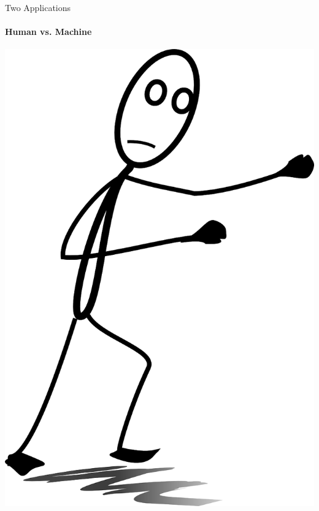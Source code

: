{\nologo
\begin{frame}{Two Applications}
	\framesubtitle{Human vs. Machine}
	\centering
	\includegraphics[width=\textwidth,height=0.75\textheight,keepaspectratio]{fig/fight.png}

\end{frame}}
